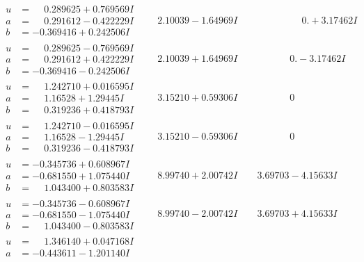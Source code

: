 \documentclass[1p]{elsarticle_modified}
\theoremstyle{definition}
\begin{document}
$$\begin{array}{c|c|c}
\begin{aligned}
u &= \phantom{-}0.289625 + 0.769569 I \\
a &= \phantom{-}0.291612 - 0.422229 I \\
b &= -0.369416 + 0.242506 I\end{aligned}
 & \phantom{-}2.10039 - 1.64969 I & \phantom{-0.000000 -}0. + 3.17462 I \\ \hline\begin{aligned}
u &= \phantom{-}0.289625 - 0.769569 I \\
a &= \phantom{-}0.291612 + 0.422229 I \\
b &= -0.369416 - 0.242506 I\end{aligned}
 & \phantom{-}2.10039 + 1.64969 I & \phantom{-0.000000 } 0. - 3.17462 I \\ \hline\begin{aligned}
u &= \phantom{-}1.242710 + 0.016595 I \\
a &= \phantom{-}1.16528 + 1.29445 I \\
b &= \phantom{-}0.319236 + 0.418793 I\end{aligned}
 & \phantom{-}3.15210 + 0.59306 I & \phantom{-0.000000 } 0 \\ \hline\begin{aligned}
u &= \phantom{-}1.242710 - 0.016595 I \\
a &= \phantom{-}1.16528 - 1.29445 I \\
b &= \phantom{-}0.319236 - 0.418793 I\end{aligned}
 & \phantom{-}3.15210 - 0.59306 I & \phantom{-0.000000 } 0 \\ \hline\begin{aligned}
u &= -0.345736 + 0.608967 I \\
a &= -0.681550 + 1.075440 I \\
b &= \phantom{-}1.043400 + 0.803583 I\end{aligned}
 & \phantom{-}8.99740 + 2.00742 I & \phantom{-}3.69703 - 4.15633 I \\ \hline\begin{aligned}
u &= -0.345736 - 0.608967 I \\
a &= -0.681550 - 1.075440 I \\
b &= \phantom{-}1.043400 - 0.803583 I\end{aligned}
 & \phantom{-}8.99740 - 2.00742 I & \phantom{-}3.69703 + 4.15633 I \\ \hline\begin{aligned}
u &= \phantom{-}1.346140 + 0.047168 I \\
a &= -0.443611 - 1.201140 I \\

\end{aligned}
\end{array}$$
\end{document}
